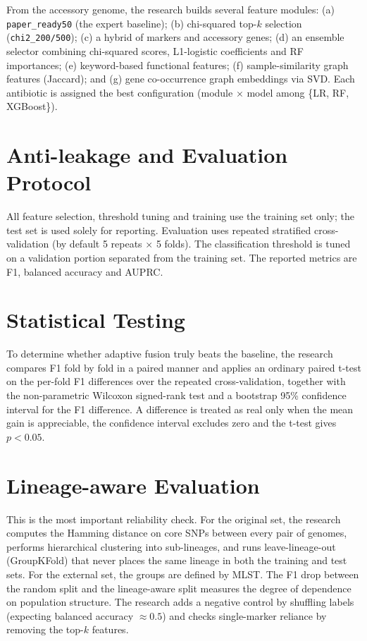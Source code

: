 \documentclass[../main.tex]{subfiles}
\begin{document}
From the accessory genome, the research builds several feature modules: (a) \texttt{paper\_ready50} (the expert baseline); (b) chi-squared top-$k$ selection (\texttt{chi2\_200/500}); (c) a hybrid of markers and accessory genes; (d) an ensemble selector combining chi-squared scores, L1-logistic coefficients and RF importances; (e) keyword-based functional features; (f) sample-similarity graph features (Jaccard); and (g) gene co-occurrence graph embeddings via SVD. Each antibiotic is assigned the best configuration (module $\times$ model among \{LR, RF, XGBoost\}).

\section{Anti-leakage and Evaluation Protocol}

All feature selection, threshold tuning and training use the training set only; the test set is used solely for reporting. Evaluation uses repeated stratified cross-validation (by default 5 repeats $\times$ 5 folds). The classification threshold is tuned on a validation portion separated from the training set. The reported metrics are F1, balanced accuracy and AUPRC.

\section{Statistical Testing}

To determine whether adaptive fusion truly beats the baseline, the research compares F1 fold by fold in a paired manner and applies an ordinary paired t-test on the per-fold F1 differences over the repeated cross-validation, together with the non-parametric Wilcoxon signed-rank test and a bootstrap 95\% confidence interval for the F1 difference. A difference is treated as real only when the mean gain is appreciable, the confidence interval excludes zero and the t-test gives $p < 0.05$.

\section{Lineage-aware Evaluation}

This is the most important reliability check. For the original set, the research computes the Hamming distance on core SNPs between every pair of genomes, performs hierarchical clustering into sub-lineages, and runs leave-lineage-out (GroupKFold) that never places the same lineage in both the training and test sets. For the external set, the groups are defined by MLST. The F1 drop between the random split and the lineage-aware split measures the degree of dependence on population structure. The research adds a negative control by shuffling labels (expecting balanced accuracy $\approx 0.5$) and checks single-marker reliance by removing the top-$k$ features.
\end{document}
